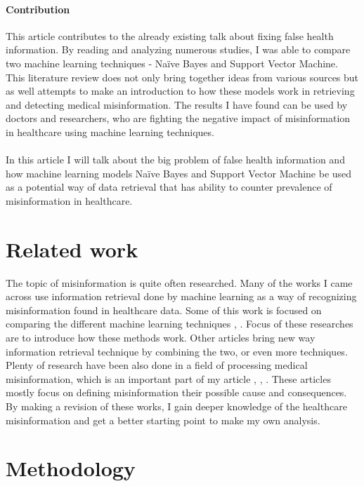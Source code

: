 \documentclass[11pt ,english,a4paper]{article}
\begin{document}
\paragraph {Contribution} This article contributes to the already existing talk about fixing false health information. By reading and analyzing numerous studies, I was able to compare two machine learning techniques - Naïve Bayes and Support Vector Machine. This literature review does not only bring together ideas from various sources but as well attempts to make an introduction to how these models work in retrieving and detecting medical misinformation. The results I have found can be used by doctors and researchers, who are fighting the negative impact of misinformation in healthcare using machine learning techniques. 

\paragraph {} In this article I will talk about the big problem of false health information and how machine learning models Naïve Bayes and Support Vector Machine be used as a potential way of data retrieval that has ability to counter prevalence of misinformation in healthcare.

\section{Related work}

The topic of misinformation is quite often researched. Many of the works I came across use information retrieval done by machine learning as a way of recognizing misinformation found in healthcare data. Some of this work is focused on comparing the different machine learning techniques \cite{sha20mach}, \cite{pod19mach}. Focus of these researches are to introduce how these methods work. Other articles bring new way information retrieval technique \cite{chap22unmask} by combining the two, or even more techniques. Plenty of research have been also done in a field of processing medical misinformation, which is an important part of my article \cite{gu20misinfo}, \cite{cook15misinfo}, \cite{wa19sys}. These articles mostly focus on defining misinformation their possible cause and consequences. By making a revision of these works, I gain deeper knowledge of the healthcare misinformation and get a better starting point to make my own analysis.

\section{Methodology}\label{methodology}
\end{document}
